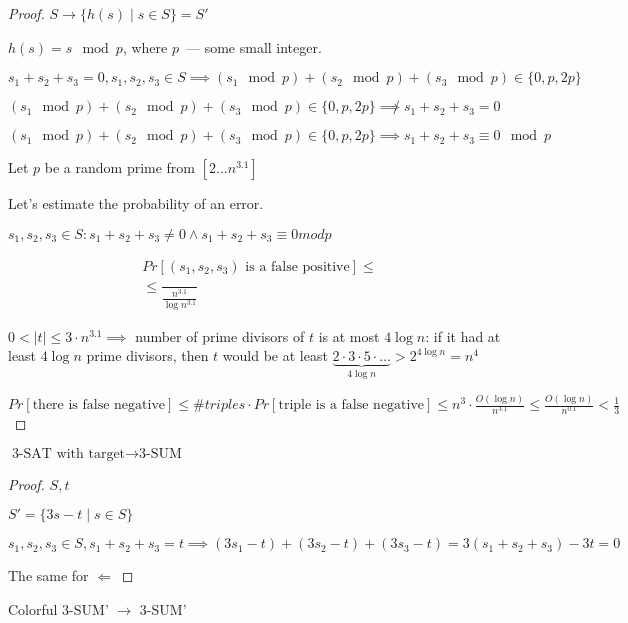 \begin{proof}
	$S \to \{h(s) \mid s \in S\} = S'$

	$h(s) = s \mod p$, where $p$~--- some small integer.

	$s_1 + s_2 + s_3 = 0, s_1, s_2, s_3 \in S \implies (s_1 \mod p) + (s_2 \mod p) + (s_3 \mod p) \in \{0, p, 2p\}$

	$(s_1 \mod p) + (s_2 \mod p) + (s_3 \mod p) \in \{0, p, 2p\} \not\implies s_1 + s_2 + s_3 = 0$


	$(s_1 \mod p) + (s_2 \mod p) + (s_3 \mod p) \in \{0, p, 2p\} \implies s_1 + s_2 + s_3 \equiv 0 \mod p$

	Let $p$ be a random prime from $[2 \ldots n^{3.1}]$


	Let's estimate the probability of an error.

	$s_1, s_2, s_3 \in S: s_1 + s_2 + s_3 \ne 0 \land s_1 + s_2 + s_3 \equiv 0 mod p$

	\begin{align*}
		Pr[(s_1, s_2, s_3) \text{ is a false positive}] \le \\
		\le \dfrac{}{\frac{n^{3.1}}{\log n^{3.1}}}
	\end{align*}

	$0 < |t| \le 3 \cdot n^{3.1} \implies $ number of prime divisors of $t $ is at most $4 \log n$: if it had at least $4 \log n$ prime divisors, then $t $ would be at least $\underbrace{2 \cdot 3 \cdot 5 \cdot \ldots}_{4\log n} > 2 ^{4 \log n} = n^4$

	$Pr[\text{there is false negative}] \le \#triples \cdot Pr[\text{triple is a false negative}] \le n^3 \cdot \frac{O(\log n)}{n^{3.1}} \le \frac{O(\log n)}{n^{0.1}} < \frac{1}{3}$
\end{proof}

\begin{lm}
	$\text{3-SAT with target} \to \text{3-SUM}$
\end{lm}

\begin{proof}
	$S, t$

	$S' = \{3s - t \mid s \in S\}$

	$s_1, s_2, s_3 \in S, s_1 + s_2 + s_3 = t \implies (3s_1 - t) + (3s_2 - t) + (3s_3 - t) = 3(s_1 + s_2 + s_3) - 3t = 0$

	The same for $\Leftarrow$
\end{proof}

\begin{lm}
	Colorful 3-SUM' $\to $ 3-SUM'
\end{lm}

